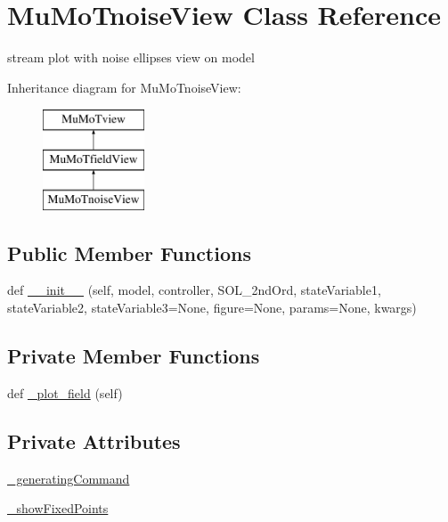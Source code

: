 \hypertarget{class_mu_mo_t_1_1_mu_mo_t_1_1_mu_mo_tnoise_view}{}\section{Mu\+Mo\+Tnoise\+View Class Reference}
\label{class_mu_mo_t_1_1_mu_mo_t_1_1_mu_mo_tnoise_view}


stream plot with noise ellipses view on model  


Inheritance diagram for Mu\+Mo\+Tnoise\+View\+:\begin{figure}[H]
\begin{center}
\leavevmode
\includegraphics[height=3.000000cm]{class_mu_mo_t_1_1_mu_mo_t_1_1_mu_mo_tnoise_view}
\end{center}
\end{figure}
\subsection*{Public Member Functions}
\begin{DoxyCompactItemize}
\item 
def \hyperlink{class_mu_mo_t_1_1_mu_mo_t_1_1_mu_mo_tnoise_view_a84e681320c67584b27e757b9bf8e80af}{\+\_\+\+\_\+init\+\_\+\+\_\+} (self, model, controller, S\+O\+L\+\_\+2nd\+Ord, state\+Variable1, state\+Variable2, state\+Variable3=None, figure=None, params=None, kwargs)
\end{DoxyCompactItemize}
\subsection*{Private Member Functions}
\begin{DoxyCompactItemize}
\item 
def \hyperlink{class_mu_mo_t_1_1_mu_mo_t_1_1_mu_mo_tnoise_view_a50d59419298116f738a98c864afb9d89}{\+\_\+plot\+\_\+field} (self)
\end{DoxyCompactItemize}
\subsection*{Private Attributes}
\begin{DoxyCompactItemize}
\item 
\hyperlink{class_mu_mo_t_1_1_mu_mo_t_1_1_mu_mo_tnoise_view_ace48ed03490093d8f44cde91e2f1e86e}{\+\_\+generating\+Command}
\item 
\hyperlink{class_mu_mo_t_1_1_mu_mo_t_1_1_mu_mo_tnoise_view_ac83a924ad62a2461d65b5c9bf9d27453}{\+\_\+show\+Fixed\+Points}
\end{DoxyCompactItemize}
